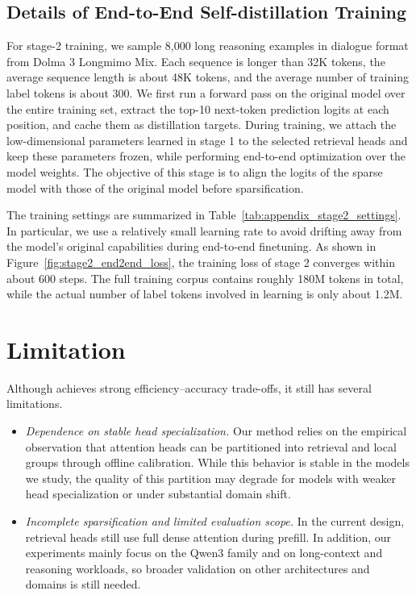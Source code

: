 \subsection{Details of End-to-End Self-distillation Training}
\label{appd:train_stage_2}

For stage-2 training, we sample 8,000 long reasoning examples in dialogue format from Dolma 3 Longmimo Mix. Each sequence is longer than 32K tokens, the average sequence length is about 48K tokens, and the average number of training label tokens is about 300. We first run a forward pass on the original model over the entire training set, extract the top-10 next-token prediction logits at each position, and cache them as distillation targets. During training, we attach the low-dimensional parameters learned in stage 1 to the selected retrieval heads and keep these parameters frozen, while performing end-to-end optimization over the model weights. The objective of this stage is to align the logits of the sparse model with those of the original model before sparsification.

The training settings are summarized in Table~\ref{tab:appendix_stage2_settings}. In particular, we use a relatively small learning rate to avoid drifting away from the model's original capabilities during end-to-end finetuning. As shown in Figure~\ref{fig:stage2_end2end_loss}, the training loss of stage 2 converges within about 600 steps. The full training corpus contains roughly 180M tokens in total, while the actual number of label tokens involved in learning is only about 1.2M.


\section{Limitation} \label{appd:limitation}

Although \name achieves strong efficiency--accuracy trade-offs, it still has several limitations.

\begin{itemize}[leftmargin=*, itemindent=0pt]
    \item \emph{Dependence on stable head specialization.} Our method relies on the empirical observation that attention heads can be partitioned into retrieval and local groups through offline calibration. While this behavior is stable in the models we study, the quality of this partition may degrade for models with weaker head specialization or under substantial domain shift.

    \item \emph{Incomplete sparsification and limited evaluation scope.} In the current design, retrieval heads still use full dense attention during prefill. In addition, our experiments mainly focus on the Qwen3 family and on long-context and reasoning workloads, so broader validation on other architectures and domains is still needed.
\end{itemize}

